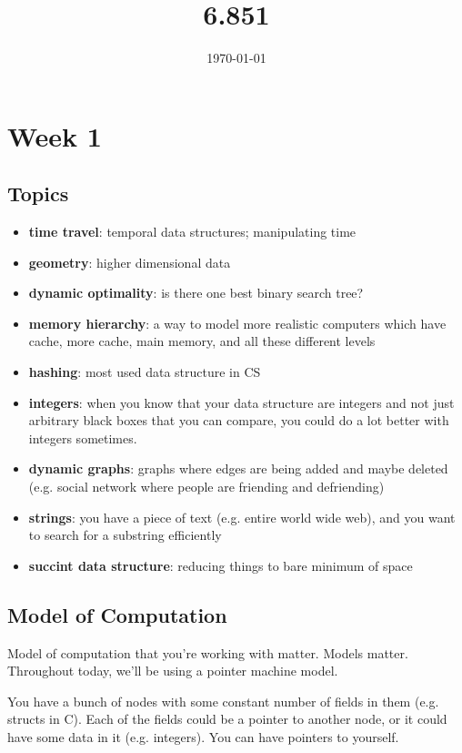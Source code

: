 \documentclass[11pt]{scrartcl}
\title{6.851}
\date{\today}
\begin{document}
\maketitle
\tableofcontents
\section{Week 1}
\subsection{Topics}
\begin{itemize}
	\item \textbf{time travel}: temporal data structures; manipulating time
	\item \textbf{geometry}: higher dimensional data
	\item \textbf{dynamic optimality}: is there one best binary search tree?
	\item \textbf{memory hierarchy}: a way to model more realistic computers which have cache, more cache, main memory, and all these different levels
	\item \textbf{hashing}: most used data structure in CS
	\item \textbf{integers}: when you know that your data structure are integers and not just arbitrary black boxes that you can compare, you could do a lot better with integers sometimes. 
	\item \textbf{dynamic graphs}: graphs where edges are being added and maybe deleted (e.g. social network where people are friending and defriending)
	\item \textbf{strings}: you have a piece of text (e.g. entire world wide web), and you want to search for a substring efficiently
	\item \textbf{succint data structure}: reducing things to bare minimum of space 
\end{itemize}
\subsection{Model of Computation}
Model of computation that you're working with matter. Models matter. Throughout today, we'll be using a pointer machine model. 

You have a bunch of nodes with some constant number of fields in them (e.g. structs in C). Each of the fields could be a pointer to another node, or it could have some data in it (e.g. integers). You can have pointers to yourself. 
\end{document}

